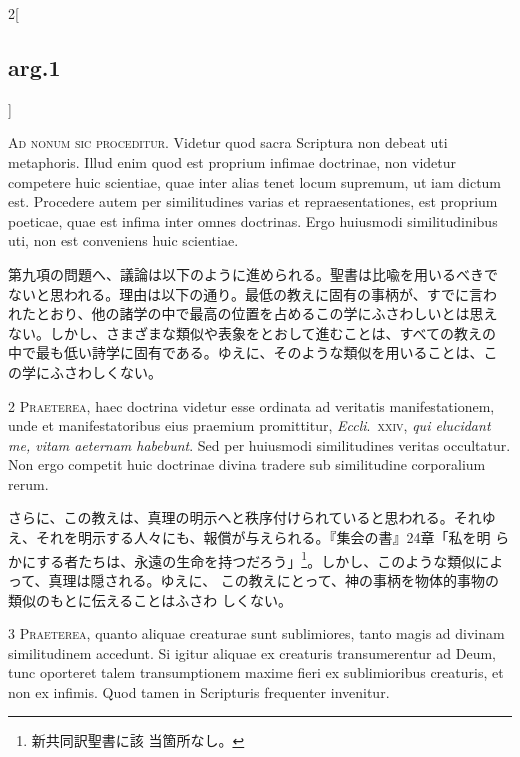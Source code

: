 \documentclass[
paper=a4paper,
fontsize=10pt,
jafontsize=9pt,
titlepage
]{jlreq}
\begin{document}
\begin{paracol}{2}[\subsection{arg.1}]

{\Huge A}{\scshape d nonum sic proceditur}. Videtur quod sacra
Scriptura non debeat uti metaphoris. Illud enim quod est proprium
infimae doctrinae, non videtur competere huic scientiae, quae inter
alias tenet locum supremum, ut iam dictum est. Procedere autem per
similitudines varias et repraesentationes, est proprium poeticae, quae
est infima inter omnes doctrinas. Ergo huiusmodi similitudinibus uti,
non est conveniens huic scientiae.

\switchcolumn

第九項の問題へ、議論は以下のように進められる。聖書は比喩を用いるべきで
ないと思われる。理由は以下の通り。最低の教えに固有の事柄が、すでに言わ
れたとおり、他の諸学の中で最高の位置を占めるこの学にふさわしいとは思え
ない。しかし、さまざまな類似や表象をとおして進むことは、すべての教えの
中で最も低い詩学に固有である。ゆえに、そのような類似を用いることは、こ
の学にふさわしくない。


{\scshape 2 Praeterea}, haec doctrina videtur esse ordinata ad
veritatis manifestationem, unde et manifestatoribus eius praemium
promittitur, {\itshape Eccli}.~{\scshape xxiv}, {\itshape qui
elucidant me, vitam aeternam habebunt}. Sed per huiusmodi
similitudines veritas occultatur. Non ergo competit huic doctrinae
divina tradere sub similitudine corporalium rerum.

\switchcolumn

さらに、この教えは、真理の明示へと秩序付けられていると思われる。それゆ
え、それを明示する人々にも、報償が与えられる。『集会の書』24章「私を明
らかにする者たちは、永遠の生命を持つだろう」\footnote{新共同訳聖書に該
当箇所なし。}。しかし、このような類似によって、真理は隠される。ゆえに、
この教えにとって、神の事柄を物体的事物の類似のもとに伝えることはふさわ
しくない。


{\scshape 3 Praeterea}, quanto aliquae creaturae sunt sublimiores,
tanto magis ad divinam similitudinem accedunt. Si igitur aliquae ex
creaturis transumerentur ad Deum, tunc oporteret talem transumptionem
maxime fieri ex sublimioribus creaturis, et non ex infimis. Quod tamen
in Scripturis frequenter invenitur.


\end{paracol}
\end{document}
